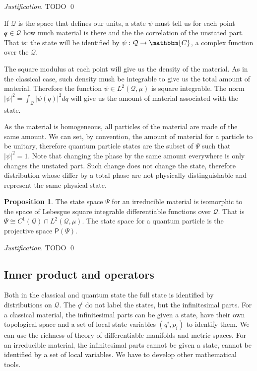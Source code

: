 \documentclass[aps,pra,10pt,twocolumn,floatfix,nofootinbib]{revtex4-1}
\numberwithin{equation}{section}
\theoremstyle{definition}
\newtheorem{prop}[equation]{Proposition}
\newenvironment{justification}{\emph{Justification}.}{\qed}
\begin{document}
\begin{justification}
	TODO
\end{justification}

If $\mathcal{Q}$ is the space that defines our units, a state $\psi$ must tell us for each point $\mathcal{q} \in \mathcal{Q}$ how much material is there and the the correlation of the unstated part. That is: the state will be identified by $\psi : \mathcal{Q} \rightarrow \mathbbm{C}$, a complex function over the $\mathcal{Q}$.

The square modulus at each point will give us the density of the material. As in the classical case, such density mush be integrable to give us the total amount of material. Therefore the function $\psi \in L^2(\mathcal{Q}, \mu)$ is square integrable. The norm $|\psi|^2 = \int_{\mathcal{Q}} |\psi(q)|^2 dq$ will give us the amount of material associated with the state.

As the material is homogeneous, all particles of the material are made of the same amount. We can set, by convention, the amount of material for a particle to be unitary, therefore quantum particle states are the subset of $\Psi$ such that $|\psi|^2 = 1$. Note that changing the phase by the same amount everywhere is only changes the unstated part. Such change does not change the state, therefore distribution whose differ by a total phase are not physically distinguishable and represent the same physical state.

\begin{prop}\label{prop:wavefuntion}
	The state space $\Psi$ for an irreducible material is isomorphic to the space of Lebesgue square integrable differentiable functions over $\mathcal{Q}$. That is $\Psi \cong C^1(\mathcal{Q}) \cap L^2(\mathcal{Q}, \mu)$. The state space for a quantum particle is the projective space $\mathsf{P}(\Psi)$.
\end{prop}
\begin{justification}
	TODO
\end{justification}

\subsection{Inner product and operators}

Both in the classical and quantum state the full state is identified by distributions on $\mathcal{Q}$. The $q^i$ do not label the states, but the infinitesimal parts. For a classical material, the infinitesimal parts can be given a state, have their own topological space and a set of local state variables $(q^i, p_i)$ to identify them. We can use the richness of theory of differentiable manifolds and metric spaces. For an irreducible material, the infinitesimal parts cannot be given a state, cannot be identified by a set of local variables. We have to develop other mathematical tools.
\end{document}
